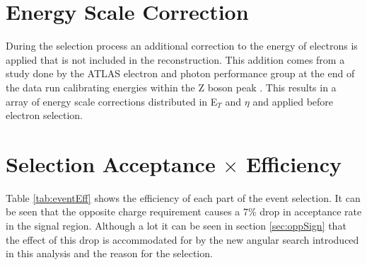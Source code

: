 \section{Energy Scale Correction}

   During the selection process an additional correction to the energy of electrons is applied that is not included in the reconstruction. This addition comes from a study done by the ATLAS electron and photon performance group at the end of the data run calibrating energies within the Z boson peak \cite{ATLAS-CONF-2014-032}. This results in a array of energy scale corrections distributed in E$_{T}$ and $\eta$ and applied before electron selection.




\section{Selection Acceptance $\times$ Efficiency}

   Table \ref{tab:eventEff} shows the efficiency of each part of the event selection. It can be seen that the opposite charge requirement causes a 7\% drop in acceptance rate in the signal region. Although a lot it can be seen in section \ref{sec:oppSign} that the effect of this drop is accommodated for by the new angular search introduced in this analysis and the reason for the selection.





